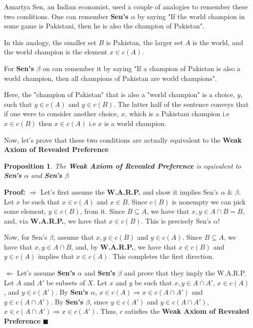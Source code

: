 \documentclass[12pt]{article}
\theoremstyle{plain}
\newtheorem{prop}{Proposition}[section]
\theoremstyle{definition}
\theoremstyle{remark}
\newcommand{\3}{\vspace*{3mm}}
\newcommand{\intersect}{\cap}
\newcommand{\RIGHT}{\Longrightarrow}
\newcommand{\LEFT}{\Longleftarrow}
\newcommand{\QED}{\blacksquare}
\newcommand{\Proof}{\textbf{Proof:} \hspace*{0.25mm}}
\begin{document}
Amartya Sen, an Indian economist, used a couple of analogies to remember these two conditions. One can remember \textbf{Sen's $\alpha$} by saying "If the world champion in some game is Pakistani, then he is also the champion of Pakistan".  

\quad In this analogy, the smaller set $B$ is Pakistan, the larger set $A$ is the world, and the world champion is the element $x \in c(A)$. 


For \textbf{Sen's $\beta$} on can remember it by saying "If a champion of Pakistan is also a world champion,
then all champions of Pakistan are world champions". 

\quad Here, the "champion of Pakistan" that is also a "world champion" is a choice, $y$, such that $y \in c(A)$ and $y \in c(B)$. The latter half of the sentence conveys that if one were to consider another choice, $x$, which is a Pakistani champion i.e $x \in c(B)$ then $x \in c(A)$ i.e $x$ is a world champion.  


Now, let's prove that these two conditions are actually equivalent to the \textbf{Weak Axiom of Revealed Preference}

\begin{prop}

The \textbf{Weak Axiom of Revealed Preference} is equivalent to \textbf{Sen's $\alpha$} and \textbf{Sen's $\beta$} 

\end{prop}

\Proof $\RIGHT$ Let's first assume the \textbf{W.A.R.P.} and show it implies Sen's $\alpha$ \& $\beta$. Let $x$ be such that $x \in c(A)$ and $x \in B$. Since $c(B)$ is nonempty we can pick some element, $y \in c(B)$, from it. Since $B \subseteq A$, we have that $x, y \in A \intersect B = B$, and, via \textbf{W.A.R.P.}, we have that $x \in c(B)$. This is precisely Sen's $\alpha$! 


Now, for Sen's $\beta$, assume that $x, y \in c(B)$ and $y \in c(A)$. Since $B \subseteq A$, we have that $x, y \in A \intersect B$, and, by \textbf{W.A.R.P.}, we have that $x \in c(B)$ and $y \in c(A)$ implies that $x \in c(A)$. This completes the first direction.


$\LEFT$ Let's assume \textbf{Sen's $\alpha$} and \textbf{Sen's $\beta$} and prove that they imply the W.A.R.P. Let $A$ and $A'$ be subsets of $X$. Let $x$ and $y$ be such that $x, y \in A \intersect A'$, $x \in c(A)$, and $y \in c(A')$. By \textbf{Sen's $\alpha$}, $x \in c(A) \RIGHT x \in c(A \intersect A')$ and $y \in c(A \intersect A')$. By \textbf{Sen's $\beta$}, since $y \in c(A')$ and $y \in c(A \intersect A')$, $x \in c(A \intersect A') \RIGHT x \in c(A')$. Thus, $c$ satisfies the \textbf{Weak Axiom of Revealed Preference} $\QED$ 
\end{document}
